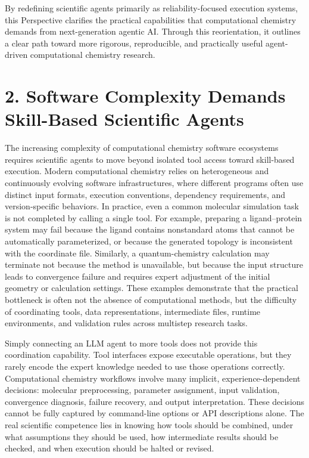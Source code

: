 \documentclass[journal=jacsat,manuscript=article]{achemso}
\begin{document}
By redefining scientific agents primarily as reliability-focused execution systems, this Perspective clarifies the practical capabilities that computational chemistry demands from next-generation agentic AI. Through this reorientation, it outlines a clear path toward more rigorous, reproducible, and practically useful agent-driven computational chemistry research.

\section{2. Software Complexity Demands Skill-Based Scientific Agents}
The increasing complexity of computational chemistry software ecosystems requires scientific agents to move beyond isolated tool access toward skill-based execution. Modern computational chemistry relies on heterogeneous and continuously evolving software infrastructures, where different programs often use distinct input formats, execution conventions, dependency requirements, and version-specific behaviors. In practice, even a common molecular simulation task is not completed by calling a single tool. For example, preparing a ligand--protein system may fail because the ligand contains nonstandard atoms that cannot be automatically parameterized, or because the generated topology is inconsistent with the coordinate file. Similarly, a quantum-chemistry calculation may terminate not because the method is unavailable, but because the input structure leads to convergence failure and requires expert adjustment of the initial geometry or calculation settings. These examples demonstrate that the practical bottleneck is often not the absence of computational methods, but the difficulty of coordinating tools, data representations, intermediate files, runtime environments, and validation rules across multistep research tasks.

Simply connecting an LLM agent to more tools does not provide this coordination capability. Tool interfaces expose executable operations, but they rarely encode the expert knowledge needed to use those operations correctly. Computational chemistry workflows involve many implicit, experience-dependent decisions: molecular preprocessing, parameter assignment, input validation, convergence diagnosis, failure recovery, and output interpretation. These decisions cannot be fully captured by command-line options or API descriptions alone. The real scientific competence lies in knowing how tools should be combined, under what assumptions they should be used, how intermediate results should be checked, and when execution should be halted or revised.
\end{document}
